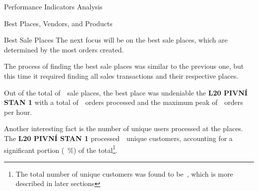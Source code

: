 \begin{section}{Performance Indicators Analysis}
\begin{subsection}{Best Places, Vendors, and Products}
\begin{subsubsection}{Best Sale Places}
			The next focus will be on the best sale places, which are determined by the most orders created.


			The process of finding the best sale places was similar to the previous one, but this time it required finding all sales transactions and their respective places.

			Out of the total of~~sale places, the best place was undeniable the \textbf{L20 PIVNÍ STAN 1} with a total of~~orders processed and the maximum peak of~~orders per hour.

			Another interesting fact is the number of unique users processed at the places.
			The \textbf{L20 PIVNÍ STAN 1} processed~~unique customers, accounting for a significant portion (~\%)
			of the total\footnote{The total number of unique customers was found to be~, which is more described in later sections}.


\end{subsubsection}
\end{subsection}
\end{section}
